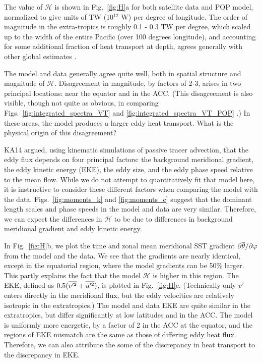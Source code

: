 \documentclass[10pt]{article}
\newcommand{\ol}{\ensuremath{\overline}}
\begin{document}
The value of $\mathcal{H}$ is shown in Fig.~\ref{fig:H}a for both satellite data and POP model, normalized to give units of TW (10$^{12}$ W) per degree of longitude. The order of magnitude in the extra-tropics is roughly 0.1 - 0.3 TW per degree, which scaled up to the width of the entire Pacific (over 100 degrees longitude), and accounting for some additional fraction of heat transport at depth, agrees generally with other global estimates \citep{JayneMarotzke2002,VolkovEtAl2008,DongEtAl2014}. 

The model and data generally agree quite well, both in spatial structure and magnitude of $\mathcal{H}$. Disagreement in magnitude, by factors of 2-3, arises in two principal locations: near the equator and in the ACC. (This disagreement is also visible, though not quite as obvious, in comparing Figs.~\ref{fig:integrated_spectra_VT} and \ref{fig:integrated_spectra_VT_POP} .) In these areas, the model produces a larger eddy heat transport. What is the physical origin of this disagreement?

KA14 argued, using kinematic simulations of passive tracer advection, that the eddy flux depends on four principal factors: the background meridional gradient, the eddy kinetic energy (EKE), the eddy size, and the eddy phase speed relative to the mean flow. While we do not attempt to quantitatively fit that model here, it is instructive to consider these different factors when comparing the model with the data. Figs.~\ref{fig:moments_k} and \ref{fig:moments_c} suggest that the dominant length scales and phase speeds in the model and data are very similar. Therefore, we can expect the differences in $\mathcal{H}$ to be due to differences in background meridional gradient and eddy kinetic energy. 

In Fig.~\ref{fig:H}b, we plot the time and zonal mean meridional SST gradient $\partial \ol{\theta} /\partial \varphi$ from the model and the data. We see that the gradients are nearly identical, except in the equatorial region, where the model gradients can be 50\% larger. This partly explains the fact that the model $\mathcal{H}$ is higher in this region. The EKE, defined as $0.5 ( \ol{v'^2} + \ol{u'^2} )$, is plotted in Fig.~\ref{fig:H}c. (Technically only $v'$ enters directly in the meridional flux, but the eddy velocities are relatively isotropic in the extratropics.) The model and data EKE are quite similar in the extratropics, but differ significantly at low latitudes and in the ACC. The model is uniformly more energetic, by a factor of 2 in the ACC at the equator, and the regions of EKE mismatch are the same as those of differing eddy heat flux. Therefore, we can also attribute the some of the discrepancy in heat transport to the discrepancy in EKE.
\end{document}
